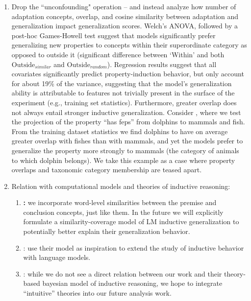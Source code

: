 \documentclass[10pt,letterpaper]{article}
\begin{document}
\begin{enumerate}
    \item Drop the ``unconfounding" operation -- and instead analyze how number of adaptation concepts, overlap, and cosine similarity between adaptation and generalization impact generalization scores. Welch's ANOVA, followed by a post-hoc Games-Howell test suggest that models significantly prefer generalizing new properties to concepts within their superordinate category as opposed to outside it (significant difference between `Within' and both $\text{Outside}_{\textit{similar}}$ and $\text{Outside}_{\textit{random}}$). Regression results suggest that all covariates significantly predict property-induction behavior, but only account for about 19\% of the variance, suggesting that the model’s generalization ability is attributable to features not trivially present in the surface of the experiment (e.g., training set statistics). Furthermore, greater overlap does not always entail stronger inductive generalization. Consider , where we test the projection of the property “has feps” from dolphins to mammals and fish. From the training dataset statistics we find dolphins to have on average greater overlap with fishes than with mammals, and yet the models prefer to generalize the property more strongly to mammals (the category of animals to which dolphin belongs). We take this example as a case where property overlaps and taxonomic category membership are teased apart.
    \item Relation with computational models and theories of inductive reasoning:
    \begin{enumerate}
        \item \textbf{\citet{osherson1990category}:} we incorporate word-level similarities between the premise and conclusion concepts, just like them. In the future we will explicitly formulate a similarity-coverage model of LM inductive generalization to potentially better explain their generalization behavior.
        \item \citet{rogers2004semantic}: use their model as inspiration to extend the study of inductive behavior with language models.
        \item \citet{kemp2009structured}: while we do not see a direct relation between our work and their theory-based bayesian model of inductive reasoning, we hope to integrate ``intuitive'' theories into our future analysis work.
    \end{enumerate}
\end{enumerate}
\end{document}
